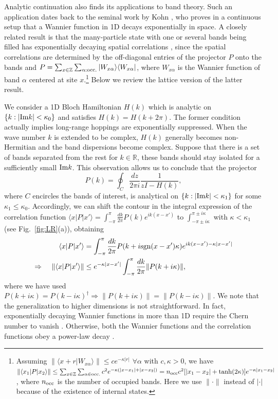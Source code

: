 \documentclass{tADP2e}
\theoremstyle{plain}
\theoremstyle{plain}
\theoremstyle{definition}
\begin{document}
\vspace{3pt}
\noindent
Analytic continuation also finds its applications to band theory. Such an application dates back to the seminal work by Kohn \cite{KW59}, who proves in a continuous setup that a Wannier function in 1D decays exponentially in space. A closely related result is that the many-particle state with one or several bands being filled has exponentially decaying spatial correlations \cite{CJD64}, since the spatial correlations are determined by the off-diagonal entries of the projector $P$ onto the bands and $P=\sum_{x\in\mathbb{Z}}\sum_{\alpha:{\rm occ.}}|W_{x\alpha}\rangle\langle W_{x\alpha}|$, where $W_{x\alpha}$ is the Wannier function of band $\alpha$ centered at site $x$.\footnote{Assuming $\|\langle x+r|W_{x\alpha}\rangle\|\le ce^{-\kappa |r|}$ $\forall \alpha$ with $c,\kappa>0$, we have $\|\langle x_1| P|x_2\rangle \| \le \sum_{x\in\mathbb{Z}}\sum_{\alpha\in{\rm occ.}}c^2e^{-\kappa(|x-x_1|+|x-x_2|)}=n_{\rm occ}c^2[|x_1-x_2|+\tanh (2\kappa)]e^{-\kappa|x_1-x_2|}$, where $n_{\rm occ}$ is the number of occupied bands. Here we use $\|\cdot\|$ instead of $|\cdot|$ because of the existence of internal states.} 
Below we review the lattice version of the latter result. 

We consider a 1D Bloch Hamiltonian $H(k)$ which is analytic on $\{k:|{\rm Im}k|<\kappa_0\}$ and satisfies $H(k)=H(k+2\pi)$. The former condition actually implies long-range hoppings are exponentially suppressed. When the wave number $k$ is extended to be complex, $H(k)$ generally becomes non-Hermitian and the band dispersions become complex. Suppose that there is a set of bands separated from the rest for $k\in\mathbb{R}$, 
these bands should stay isolated for a sufficiently small ${\rm Im}k$. This observation allows us to conclude that the projector 
\begin{equation}
P(k)=\oint_C \frac{dz}{2\pi i} \frac{1}{zI-H(k)},
\end{equation}
where $C$ encircles the bands of interest, is analytical on $\{k:|{\rm Im}k|<\kappa_1\}$ for some $\kappa_1\le \kappa_0$. Accordingly, we can shift the contour in the integral expression of the correlation function $\langle x| P | x'\rangle=\int^\pi_{-\pi}\frac{dk}{2\pi} P(k)e^{ik(x-x')}$ to $\int^{\pi\pm i\kappa}_{-\pi\pm i\kappa}$ with $\kappa<\kappa_1$ (see Fig.~\ref{fig:LR}(a)), obtaining 
\begin{equation}
\begin{split}
\langle x| P | x'\rangle&=\int^\pi_{-\pi}\frac{dk}{2\pi} P(k+i{\rm sgn}(x-x')\kappa)e^{ik(x-x')-\kappa|x-x'|} \\
\Rightarrow\;\;\;\;\|\langle x| P | x'\rangle\|&\le e^{-\kappa|x-x'|}\int^\pi_{-\pi}\frac{dk}{2\pi} \|P(k+i%
\kappa)\|,
\end{split}
\end{equation}
where we have used $P(k+i\kappa)=P(k-i\kappa)^\dag \Rightarrow \|P(k+i\kappa)\|=\|P(k-i\kappa)\|$. We note that the generalization to higher dimensions is {not} straightforward. In fact, exponentially decaying Wannier functions in more than 1D require the Chern number to vanish \cite{BC2007}. Otherwise, both the Wannier functions and the correlation functions obey a {power-law} decay \cite{WTB13}.
\end{document}
